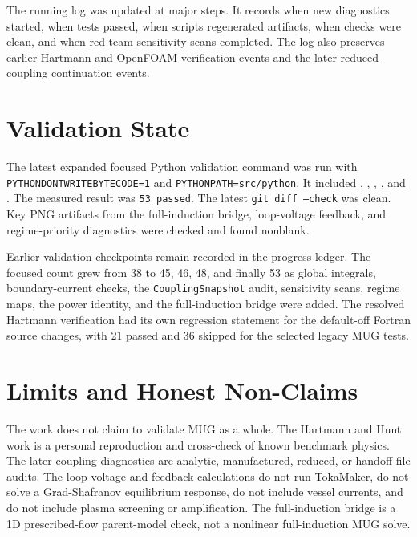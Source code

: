 \documentclass[11pt]{article}
\begin{document}
The running log  was updated at major steps. It records when new diagnostics started, when tests passed, when scripts regenerated artifacts, when checks were clean, and when red-team sensitivity scans completed. The log also preserves earlier Hartmann and OpenFOAM verification events and the later reduced-coupling continuation events.

\section{Validation State}

The latest expanded focused Python validation command was run with \texttt{PYTHONDONTWRITEBYTECODE=1} and \texttt{PYTHONPATH=src/python}. It included , , , , and . The measured result was \texttt{53 passed}. The latest \texttt{git diff --check} was clean. Key PNG artifacts from the full-induction bridge, loop-voltage feedback, and regime-priority diagnostics were checked and found nonblank.

Earlier validation checkpoints remain recorded in the progress ledger. The focused count grew from 38 to 45, 46, 48, and finally 53 as global integrals, boundary-current checks, the \texttt{CouplingSnapshot} audit, sensitivity scans, regime maps, the power identity, and the full-induction bridge were added. The resolved Hartmann verification had its own regression statement for the default-off Fortran source changes, with 21 passed and 36 skipped for the selected legacy MUG tests.

\section{Limits and Honest Non-Claims}

The work does not claim to validate MUG as a whole. The Hartmann and Hunt work is a personal reproduction and cross-check of known benchmark physics. The later coupling diagnostics are analytic, manufactured, reduced, or handoff-file audits. The loop-voltage and feedback calculations do not run TokaMaker, do not solve a Grad-Shafranov equilibrium response, do not include vessel currents, and do not include plasma screening or amplification. The full-induction bridge is a 1D prescribed-flow parent-model check, not a nonlinear full-induction MUG solve.
\end{document}
